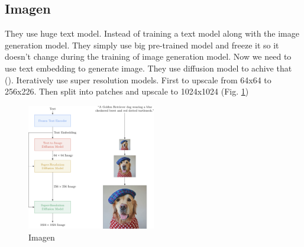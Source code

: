 \subsection{Imagen}
They use huge text model. Instead of training a text model along with the image generation model.
They simply use big pre-trained model and freeze it so it doesn't change during the training of image generation model.
Now we need to use text embedding to generate image.
They use diffusion model to achive that (\cite{saharia2022photorealistic}).
Iteratively use super resolution models. First to upscale from 64x64 to 256x226. Then split into patches and upscale to 1024x1024 (Fig. \ref{fig:imagen})

\begin{figure}[h!]
    \centering
    \includegraphics[width=0.5\textwidth]{images/imagen.jpg}
    \caption{Imagen}
    \label{fig:imagen}
\end{figure}

